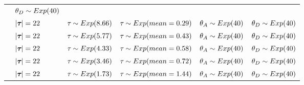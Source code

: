 \begin{table}[htbp]
\begin{tabular}{ l l l l l l }
                            & $\descendantTheta{}{} \sim Exp(40)$ \\
                            & $\lvert \boldsymbol{\tau_{}} \rvert = 22$
                            & $\tau_{} \sim Exp(8.66)$
                            & $\tau_{} \sim Exp(mean = 0.29)$
                            & $\ancestralTheta{} \sim Exp(40)$
                            & $\descendantTheta{}{} \sim Exp(40)$ \\
                            & $\lvert \boldsymbol{\tau_{}} \rvert = 22$
                            & $\tau_{} \sim Exp(5.77)$
                            & $\tau_{} \sim Exp(mean = 0.43)$
                            & $\ancestralTheta{} \sim Exp(40)$
                            & $\descendantTheta{}{} \sim Exp(40)$ \\
                            & $\lvert \boldsymbol{\tau_{}} \rvert = 22$
                            & $\tau_{} \sim Exp(4.33)$
                            & $\tau_{} \sim Exp(mean = 0.58)$
                            & $\ancestralTheta{} \sim Exp(40)$
                            & $\descendantTheta{}{} \sim Exp(40)$ \\
                            & $\lvert \boldsymbol{\tau_{}} \rvert = 22$
                            & $\tau_{} \sim Exp(3.46)$
                            & $\tau_{} \sim Exp(mean = 0.72)$
                            & $\ancestralTheta{} \sim Exp(40)$
                            & $\descendantTheta{}{} \sim Exp(40)$ \\
                            & $\lvert \boldsymbol{\tau_{}} \rvert = 22$
                            & $\tau_{} \sim Exp(1.73)$
                            & $\tau_{} \sim Exp(mean = 1.44)$
                            & $\ancestralTheta{} \sim Exp(40)$
                            & $\descendantTheta{}{} \sim Exp(40)$ \\
        \bottomrule
    \end{tabular}
    \label{tabPowerModels}
\end{table}

